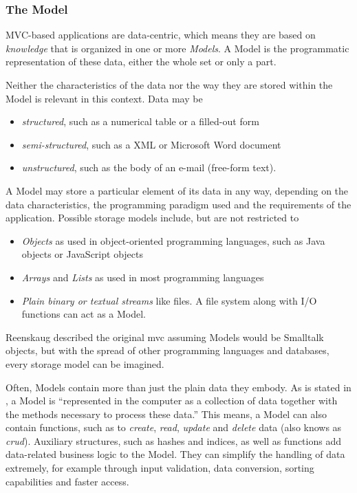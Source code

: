 \subsubsection{The Model}
MVC-based applications are data-centric, which means they are based on \emph{knowledge} that is organized in one or more \emph{Models}. A Model is the programmatic representation of these data, either the whole set or only a part.

Neither the characteristics of the data nor the way they are stored within the Model is relevant in this context. Data may be
\begin{itemize}
	\item \emph{structured}, such as a numerical table or a filled-out form
	\item \emph{semi-structured}, such as a XML or Microsoft Word document
	\item \emph{unstructured}, such as the body of an e-mail (free-form text).
\end{itemize}
A Model may store a particular element of its data in any way, depending on the data characteristics, the programming paradigm used and the requirements of the application. Possible storage models include, but are not restricted to
\begin{itemize}
	\item \emph{Objects} as used in object-oriented programming languages, such as Java objects or JavaScript objects
	\item \emph{Arrays} and \emph{Lists} as used in most programming languages
	\item \emph{Plain binary or textual streams} like files. A file system along with I/O functions can act as a Model.
\end{itemize}
Reenskaug described the original \ac{mvc} assuming Models would be Smalltalk objects, but with the spread of other programming languages and databases, every storage model can be imagined.

Often, Models contain more than just the plain data they embody. As is stated in , a Model is ``represented in the computer as a collection of data together with the methods necessary to process these data.'' This means, a Model can also contain functions, such as to \emph{create}, \emph{read}, \emph{update} and \emph{delete} data (also knows as \emph{\acs{crud}}). Auxiliary structures, such as hashes and indices, as well as functions add data-related business logic to the Model. They can simplify the handling of data extremely, for example through input validation, data conversion, sorting capabilities and faster access. %

